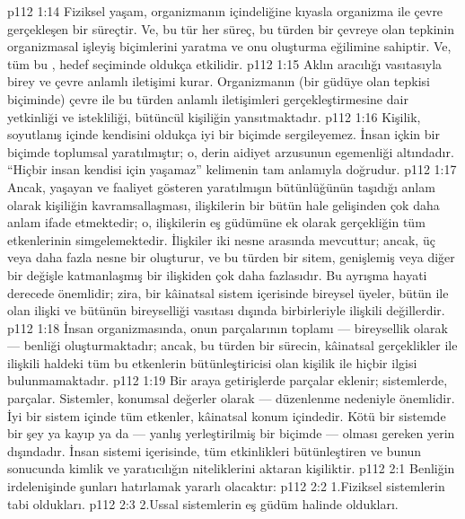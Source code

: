 \vs p112 1:14 Fiziksel yaşam, organizmanın içindeliğine kıyasla organizma ile çevre  gerçekleşen bir süreçtir. Ve, bu tür her süreç, bu türden bir çevreye olan tepkinin organizmasal işleyiş biçimlerini yaratma ve onu oluşturma eğilimine sahiptir. Ve, tüm bu , hedef seçiminde oldukça etkilidir.
\vs p112 1:15 Aklın aracılığı vasıtasıyla birey ve çevre anlamlı iletişimi kurar. Organizmanın (bir güdüye olan tepkisi biçiminde) çevre ile bu türden anlamlı iletişimleri gerçekleştirmesine dair yetkinliği ve istekliliği, bütüncül kişiliğin  yansıtmaktadır.
\vs p112 1:16 Kişilik, soyutlanış içinde kendisini oldukça iyi bir biçimde sergileyemez. İnsan içkin bir biçimde toplumsal yaratılmıştır; o, derin aidiyet arzusunun egemenliği altındadır. “Hiçbir insan kendisi için yaşamaz” kelimenin tam anlamıyla doğrudur.
\vs p112 1:17 Ancak, yaşayan ve faaliyet gösteren yaratılmışın bütünlüğünün taşıdığı anlam olarak kişiliğin kavramsallaşması, ilişkilerin bir bütün hale gelişinden çok daha anlam ifade etmektedir; o, ilişkilerin eş güdümüne ek olarak gerçekliğin tüm etkenlerinin  simgelemektedir. İlişkiler iki nesne arasında mevcuttur; ancak, üç veya daha fazla nesne bir  oluşturur, ve bu türden bir sitem, genişlemiş veya diğer bir değişle katmanlaşmış bir ilişkiden çok daha fazlasıdır. Bu ayrışma hayati derecede önemlidir; zira, bir kâinatsal sistem içerisinde bireysel üyeler, bütün ile olan ilişki ve bütünün bireyselliği vasıtası dışında birbirleriyle ilişkili değillerdir.
\vs p112 1:18 İnsan organizmasında, onun parçalarının toplamı --- bireysellik olarak --- benliği oluşturmaktadır; ancak, bu türden bir sürecin, kâinatsal gerçeklikler ile ilişkili haldeki tüm bu etkenlerin bütünleştiricisi olan kişilik ile hiçbir ilgisi bulunmamaktadır.
\vs p112 1:19 Bir araya getirişlerde parçalar eklenir; sistemlerde, parçalar. Sistemler, konumsal değerler olarak --- düzenlenme nedeniyle önemlidir. İyi bir sistem içinde tüm etkenler, kâinatsal konum içindedir. Kötü bir sistemde bir şey ya kayıp ya da --- yanlış yerleştirilmiş bir biçimde --- olması gereken yerin dışındadır. İnsan sistemi içerisinde, tüm etkinlikleri bütünleştiren ve bunun sonucunda kimlik ve yaratıcılığın niteliklerini aktaran kişiliktir.
\vs p112 2:1 Benliğin irdelenişinde şunları hatırlamak yararlı olacaktır:
\vs p112 2:2 1.\bibnobreakspace Fiziksel sistemlerin tabi oldukları.
\vs p112 2:3 2.\bibnobreakspace Ussal sistemlerin eş güdüm halinde oldukları.
